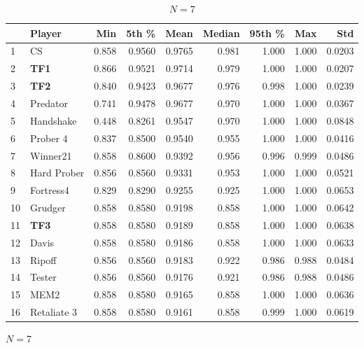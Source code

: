 \documentclass[10pt,letterpaper]{article}
\begin{document}
\begin{table}[!hbtp]
    \begin{subfigure}[t]{\columnwidth}
        \centering
            \begin{tabular}{llrrrrrrr}
            \toprule
            {} &       Player &    Min &   5th \% &    Mean &  Median &  95th \% &    Max &     Std \\
            \midrule
            1  &           CS &  0.858 &  0.9560 &  0.9765 &   0.981 &   1.000 &  1.000 &  0.0203 \\
            2  &          \textbf{TF1} &  0.866 &  0.9521 &  0.9714 &   0.979 &   1.000 &  1.000 &  0.0207 \\
            3  &          \textbf{TF2} &  0.840 &  0.9423 &  0.9677 &   0.976 &   0.998 &  1.000 &  0.0239 \\
            4  &     Predator &  0.741 &  0.9478 &  0.9677 &   0.970 &   1.000 &  1.000 &  0.0367 \\
            5  &    Handshake &  0.448 &  0.8261 &  0.9547 &   0.970 &   1.000 &  1.000 &  0.0848 \\
            6  &     Prober 4 &  0.837 &  0.8500 &  0.9540 &   0.955 &   1.000 &  1.000 &  0.0416 \\
            7  &     Winner21 &  0.858 &  0.8600 &  0.9392 &   0.956 &   0.996 &  0.999 &  0.0486 \\
            8  &  Hard Prober &  0.856 &  0.8560 &  0.9331 &   0.953 &   1.000 &  1.000 &  0.0521 \\
            9  &    Fortress4 &  0.829 &  0.8290 &  0.9255 &   0.925 &   1.000 &  1.000 &  0.0653 \\
            10 &      Grudger &  0.858 &  0.8580 &  0.9198 &   0.858 &   1.000 &  1.000 &  0.0642 \\
            11 &          \textbf{TF3} &  0.858 &  0.8580 &  0.9189 &   0.858 &   1.000 &  1.000 &  0.0638 \\
            12 &        Davis &  0.858 &  0.8580 &  0.9186 &   0.858 &   1.000 &  1.000 &  0.0633 \\
            13 &       Ripoff &  0.856 &  0.8560 &  0.9183 &   0.922 &   0.986 &  0.988 &  0.0484 \\
            14 &       Tester &  0.856 &  0.8560 &  0.9176 &   0.921 &   0.986 &  0.988 &  0.0486 \\
            15 &         MEM2 &  0.858 &  0.8580 &  0.9165 &   0.858 &   1.000 &  1.000 &  0.0636 \\
            16 &  Retaliate 3 &  0.858 &  0.8580 &  0.9161 &   0.858 &   0.999 &  1.000 &  0.0619 \\
            \bottomrule
            \end{tabular}
        \caption{\(N=7\)}
    \end{subfigure}


\end{table}
\end{document}
